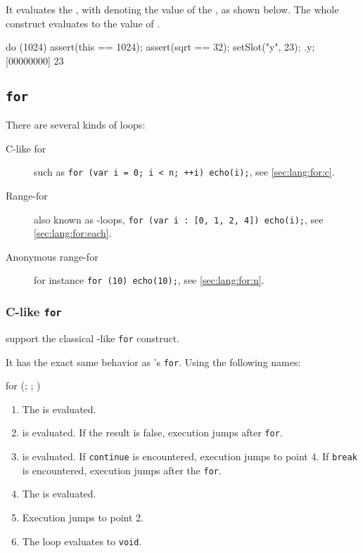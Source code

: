 
It evaluates the , with \this denoting the value of the
, as shown below.  The whole construct evaluates to the
value of .

\begin{urbiscript}
do (1024)
{
  assert(this == 1024);
  assert(sqrt == 32);
  setSlot("y", 23);
}.y;
[00000000] 23
\end{urbiscript}




\subsection{\lstinline{for}}
\label{sec:lang:for}
There are several kinds of  loops:
\begin{description}
\item[C-like for] such as
  \lstinline|for (var i = 0; i < n; ++i) echo(i);|, see
  \autoref{sec:lang:for:c}.
\item[Range-for] also known as -loops,
  \lstinline|for (var i : [0, 1, 2, 4]) echo(i);|, see
  \autoref{sec:lang:for:each}.
\item[Anonymous range-for] for instance \lstinline|for (10) echo(10);|, see
  \autoref{sec:lang:for:n}.
\end{description}

\subsubsection{C-like \lstinline{for}}
\label{sec:lang:for:c}

\us support the classical \langC-like \lstinline{for} construct.


It has the exact same behavior as \langC's \lstinline{for}.  Using the
following names:

\begin{urbiunchecked}
for (; ; )
\end{urbiunchecked}

\begin{enumerate}
\item The  is evaluated.
\item {} is evaluated. If the result is false, execution
  jumps after \lstinline{for}.
\item {} is evaluated. If \lstinline{continue} is encountered,
  execution jumps to point 4. If \lstinline{break} is encountered,
  execution jumps after the \lstinline{for}.
\item The  is evaluated.
\item Execution jumps to point 2.
\item The loop evaluates to \lstinline{void}.
\end{enumerate}

